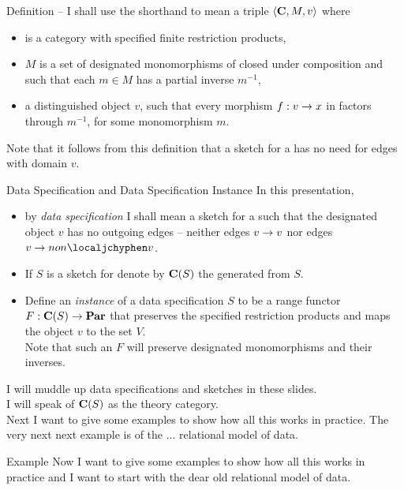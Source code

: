 
\begin{frame}{Definition -- \datacat}
\medskip
I shall use the shorthand \textit{\datacat} to mean a triple $\langle\textbf{C},M,v\rangle$ where 
\begin{itemize}
\item \catcw is a \rangeplus category with specified finite restriction products,
\item $M$ is a set of designated monomorphisms of \catcw closed under composition
and such that each $m \in M$   has a partial inverse $m^{-1}$,
\item a distinguished object $v$, such that every morphism $f: v \rightarrow x$ in \catcw 
factors through $m^{-1}$, for some monomorphism $m$.
\end{itemize}

\medskip
Note that it follows from this definition that a sketch for a \textit{\datacat} has no need for edges with domain $v$.
\end{frame}

\begin{frame}{Data Specification and Data Specification Instance}
In this presentation, 
\begin{itemize}
\item by \textit{data specification} I shall mean a sketch for a \datacatw such that the designated object $v$ has no outgoing edges -- 
 neither edges  \underline{$v \rightarrow v$} 
nor edges \underline{$v \morph non\localjchyphen v$}.\\
\item If $S$ is a sketch for \datacatw denote by $\textbf{C}(S)$ the \datacatw generated from $S$. \\
\pause \item Define an \textit{instance} of a data specification $S$ to be a 
range functor $F: \textbf{C}(S) \rightarrow \textbf{Par}$ 
that preserves the specified restriction products
and maps the object $v$ to the set $V$. \\
\medskip
Note that such an $F$ will preserve designated monomorphisms and their inverses.
\end{itemize} 
I will muddle up data specifications and sketches in these slides. \\ 
I will speak of $\textbf{C}(S)$ as the theory category. \\
\medskip
Next I want to give some examples to show how all this works in practice.
The very next next example is of the ... relational model of data.
\end{frame}

\ifNotesnAll
\begin{frame}{Example}
Now I want to give some examples to show how all this works in practice and I want to start with the dear old relational model of data. 
\end{frame}
\fi



